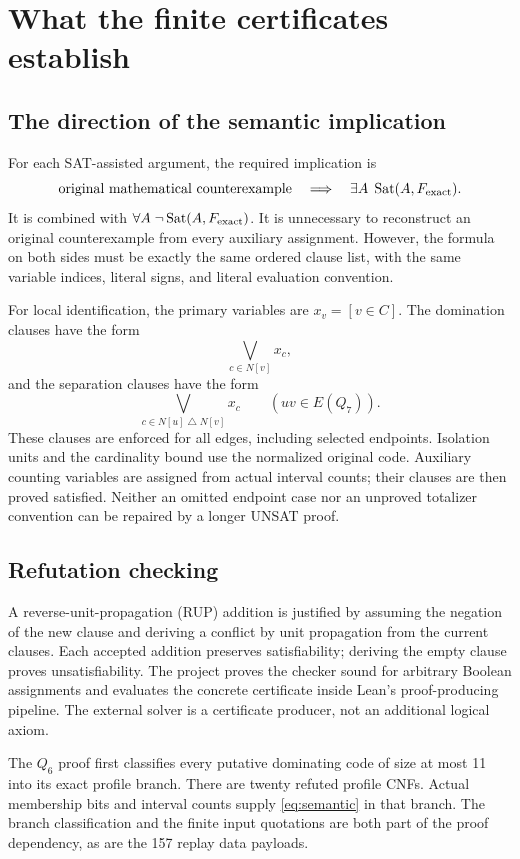\documentclass[11pt]{article}
\theoremstyle{definition}\newtheorem{definition}[theorem]{Definition}
\theoremstyle{remark}\newtheorem{remark}[theorem]{Remark}
\newcommand{\Q}{Q}
\begin{document}
\section{What the finite certificates establish}
\subsection{The direction of the semantic implication}
For each SAT-assisted argument, the required implication is
\begin{equation}\label{eq:semantic}
 \text{original mathematical counterexample}
 \quad\Longrightarrow\quad
 \exists A\;\operatorname{Sat}(A,F_{\rm exact}).
\end{equation}
It is combined with $\forall A\;\neg\operatorname{Sat}(A,F_{\rm exact})$. It is unnecessary to reconstruct an original counterexample from every auxiliary assignment. However, the formula on both sides must be exactly the same ordered clause list, with the same variable indices, literal signs, and literal evaluation convention.

For local identification, the primary variables are $x_v=[v\in C]$. The domination clauses have the form
\[
 \bigvee_{c\in N[v]}x_c,
\]
and the separation clauses have the form
\[
 \bigvee_{c\in N[u]\mathbin{\triangle}N[v]}x_c\qquad(uv\in E(\Q_7)).
\]
These clauses are enforced for all edges, including selected endpoints. Isolation units and the cardinality bound use the normalized original code. Auxiliary counting variables are assigned from actual interval counts; their clauses are then proved satisfied. Neither an omitted endpoint case nor an unproved totalizer convention can be repaired by a longer UNSAT proof.

\subsection{Refutation checking}
A reverse-unit-propagation (RUP) addition is justified by assuming the negation of the new clause and deriving a conflict by unit propagation from the current clauses. Each accepted addition preserves satisfiability; deriving the empty clause proves unsatisfiability. The project proves the checker sound for arbitrary Boolean assignments and evaluates the concrete certificate inside Lean's proof-producing pipeline. The external solver is a certificate producer, not an additional logical axiom.

The $\Q_6$ proof first classifies every putative dominating code of size at most 11 into its exact profile branch. There are twenty refuted profile CNFs. Actual membership bits and interval counts supply \eqref{eq:semantic} in that branch. The branch classification and the finite input quotations are both part of the proof dependency, as are the 157 replay data payloads.
\end{document}
